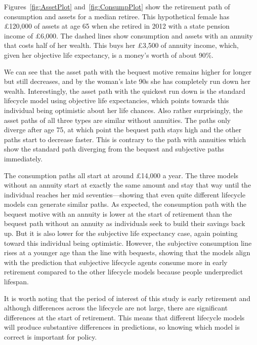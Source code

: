 \documentclass[12pt]{article}
\begin{document}
Figures~\ref{fig:AssetPlot} and~\ref{fig:ConsumpPlot} show the retirement path
of consumption and assets for a median retiree. This hypothetical female has
£120,000 of assets at age 65 when she retired in 2012 with a state pension
income of £6,000. The dashed lines show consumption and assets with an annuity
that costs half of her wealth. This buys her £3,500 of annuity income, which,
given her objective life expectancy, is a money's worth of about 90\%.

We can see that the asset path with the bequest motive remains higher for longer
but still decreases, and by the woman's late 90s she has completely run down her
wealth. Interestingly, the asset path with the quickest run down is the standard
lifecycle model using objective life expectancies, which points towards this
individual being optimistic about her life chances. Also rather surprisingly,
the asset paths of all three types are similar without annuities. The paths only
diverge after age 75, at which point the bequest path stays high and the other
paths start to decrease faster. This is contrary to the path with annuities
which show the standard path diverging from the bequest and subjective paths
immediately.

The consumption paths all start at around £14,000 a year. The three models without an
annuity start at exactly the same amount and stay that way until the individual
reaches her mid seventies---showing that even quite different lifecycle models
can generate similar paths. As expected, the consumption path with the bequest
motive with an annuity is lower at the start of retirement than the bequest path
without an annuity as individuals seek to build their savings back up. But it is
also lower for the subjective life expectancy case, again pointing toward this
individual being optimistic. However, the subjective consumption line rises at a
younger age than the line with bequests, showing that the models align with the
prediction that subjective lifecycle agents consume more in early retirement
compared to the other lifecycle models because people underpredict lifespan.

It is worth noting that the period of interest of this study is early retirement
and although differences across the lifecycle are not large, there are
significant differences at the start of retirement. This means that different
lifecycle models will produce substantive differences in predictions, so knowing
which model is correct is important for policy.
\end{document}
